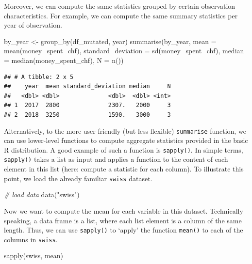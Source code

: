 \documentclass[
  12pt,
]{style/krantz}
\newenvironment{Shaded}{\begin{snugshade}}{\end{snugshade}}
\newcommand{\AttributeTok}[1]{\textcolor[rgb]{0.77,0.63,0.00}{#1}}
\newcommand{\CommentTok}[1]{\textcolor[rgb]{0.56,0.35,0.01}{\textit{#1}}}
\newcommand{\FunctionTok}[1]{\textcolor[rgb]{0.00,0.00,0.00}{#1}}
\newcommand{\NormalTok}[1]{#1}
\newcommand{\OtherTok}[1]{\textcolor[rgb]{0.56,0.35,0.01}{#1}}
\newcommand{\StringTok}[1]{\textcolor[rgb]{0.31,0.60,0.02}{#1}}
\begin{document}
Moreover, we can compute the same statistics grouped by certain observation characteristics. For example, we can compute the same summary statistics per year of observation.

\begin{Shaded}
\begin{Highlighting}[]
\NormalTok{by\_year }\OtherTok{\textless{}{-}} \FunctionTok{group\_by}\NormalTok{(df\_mutated, year)}
\FunctionTok{summarise}\NormalTok{(by\_year,}
          \AttributeTok{mean =} \FunctionTok{mean}\NormalTok{(money\_spent\_chf),}
          \AttributeTok{standard\_deviation =} \FunctionTok{sd}\NormalTok{(money\_spent\_chf),}
          \AttributeTok{median =} \FunctionTok{median}\NormalTok{(money\_spent\_chf),}
          \AttributeTok{N =} \FunctionTok{n}\NormalTok{())}
\end{Highlighting}
\end{Shaded}

\begin{verbatim}
## # A tibble: 2 x 5
##    year  mean standard_deviation median     N
##   <dbl> <dbl>              <dbl>  <dbl> <int>
## 1  2017  2800              2307.   2000     3
## 2  2018  3250              1590.   3000     3
\end{verbatim}

Alternatively, to the more user-friendly (but less flexible) \texttt{summarise} function, we can use lower-level functions to compute aggregate statistics provided in the basic R distribution. A good example of such a function is \texttt{sapply()}. In simple terms, \texttt{sapply()} takes a list as input and applies a function to the content of each element in this list (here: compute a statistic for each column). To illustrate this point, we load the already familiar \texttt{swiss} dataset.

\begin{Shaded}
\begin{Highlighting}[]
\CommentTok{\# load data}
\FunctionTok{data}\NormalTok{(}\StringTok{"swiss"}\NormalTok{)}
\end{Highlighting}
\end{Shaded}

Now we want to compute the mean for each variable in this dataset. Technically speaking, a data frame is a list, where each list element is a column of the same length. Thus, we can use \texttt{sapply()} to `apply' the function \texttt{mean()} to each of the columns in \texttt{swiss}.

\begin{Shaded}
\begin{Highlighting}[]
\FunctionTok{sapply}\NormalTok{(swiss, mean)}
\end{Highlighting}
\end{Shaded}
\end{document}
